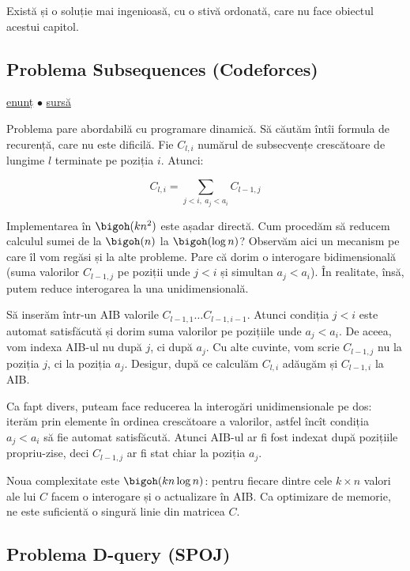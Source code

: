 Există și o soluție mai ingenioasă, cu o stivă ordonată, care nu face obiectul acestui capitol.

\subsection{Problema Subsequences (Codeforces)}
\label{problem:subsequences}

\href{https://codeforces.com/contest/597/problem/C}{enunț}
$\bullet$
\hyperref[code:subsequences]{sursă}

Problema pare abordabilă cu programare dinamică. Să căutăm întîi formula de recurență, care nu este dificilă. Fie $C_{l,i}$ numărul de subsecvențe crescătoare de lungime $l$ terminate pe poziția $i$. Atunci:

$$C_{l,i} = \sum_{j < i,\ a_j < a_i} C_{l-1,j}$$

Implementarea în $\bigoh(kn^2)$ este așadar directă. Cum procedăm să reducem calculul sumei de la $\bigoh(n)$ la $\bigoh(\log n)$? Observăm aici un mecanism pe care îl vom regăsi și la alte probleme. Pare că dorim o interogare bidimensională (suma valorilor $C_{l-1,j}$ pe poziții unde $j < i$ și simultan $a_j < a_i$). În realitate, însă, putem reduce interogarea la una unidimensională.

Să inserăm într-un AIB valorile $C_{l-1,1} \dots C_{l-1, i-1}$. Atunci condiția $j < i$ este automat satisfăcută și dorim suma valorilor pe pozițiile unde $a_j < a_i$. De aceea, vom indexa AIB-ul nu după $j$, ci după $a_j$. Cu alte cuvinte, vom scrie $C_{l-1,j}$ nu la poziția $j$, ci la poziția $a_j$. Desigur, după ce calculăm $C_{l,i}$ adăugăm și $C_{l-1,i}$ la AIB.

Ca fapt divers, puteam face reducerea la interogări unidimensionale pe dos: iterăm prin elemente în ordinea crescătoare a valorilor, astfel încît condiția $a_j < a_i$ să fie automat satisfăcută. Atunci AIB-ul ar fi fost indexat după pozițiile propriu-zise, deci $C_{l-1,j}$ ar fi stat chiar la poziția $a_j$.

Noua complexitate este $\bigoh(kn \log n)$: pentru fiecare dintre cele $k \times n$ valori ale lui $C$ facem o interogare și o actualizare în AIB. Ca optimizare de memorie, ne este suficientă o singură linie din matricea $C$.

\subsection{Problema D-query (SPOJ)}
\label{problem:dquery-fenwick}

